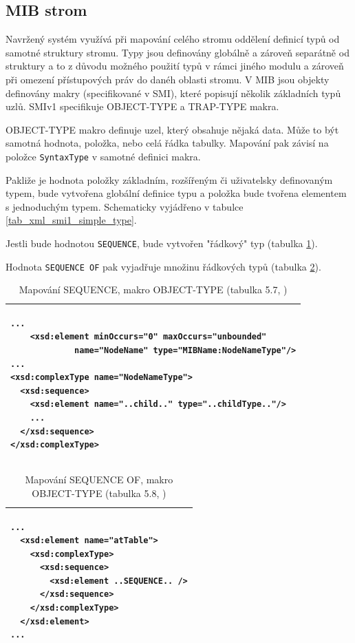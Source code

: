 \subsection{MIB strom}
Navržený systém využívá při mapování celého stromu oddělení definicí typů od samotné struktury stromu. Typy jsou definovány globálně a zároveň separátně od 
struktury a to z důvodu možného použití typů v rámci jiného modulu a zároveň při omezení přístupových práv do danéh oblasti stromu. V MIB jsou objekty
definovány makry (specifikované v SMI), které popisují několik základních typů uzlů. SMIv1 specifikuje OBJECT-TYPE a TRAP-TYPE makra.

OBJECT-TYPE makro definuje uzel, který obsahuje nějaká data. Může to být samotná hodnota, položka, nebo celá řádka tabulky. Mapování pak závisí na
položce \verb|SyntaxType| v samotné definici makra.

Pakliže je hodnota položky základním, rozšířeným či uživatelsky definovaným typem, bude vytvořena globální definice typu a položka bude tvořena elementem
s jednoduchým typem. Schematicky vyjádřeno v tabulce \ref{tab_xml_smi1_simple_type}.

Jestli bude hodnotou \verb|SEQUENCE|, bude vytvořen "řádkový" typ (tabulka \ref{tab_xml_smi1_sequence}).

Hodnota \verb|SEQUENCE OF| pak vyjadřuje množinu řádkových typů (tabulka \ref{tab_xml_smi1_sequenceof}).


\begin{table}
	\centering
	{\footnotesize
	  \begin{tabular}{|p{15cm}|}
      \hline
\begin{verbatim}...
    <xsd:element minOccurs="0" maxOccurs="unbounded"
             name="NodeName" type="MIBName:NodeNameType"/>
...
<xsd:complexType name="NodeNameType">
  <xsd:sequence>
    <xsd:element name="..child.." type="..childType.."/>
    ...
  </xsd:sequence>
</xsd:complexType>\end{verbatim}\\
      \hline
    \end{tabular}
  }
	\caption{Mapování SEQUENCE, makro OBJECT-TYPE (tabulka 5.7, \cite{macejko_dipl})}
	\label{tab_xml_smi1_sequence}
\end{table}

\begin{table}
	\centering
	{\footnotesize
	  \begin{tabular}{|p{15cm}|}
      \hline
\begin{verbatim}...
  <xsd:element name="atTable">
    <xsd:complexType>
      <xsd:sequence>
        <xsd:element ..SEQUENCE.. />
      </xsd:sequence>
    </xsd:complexType>
  </xsd:element>
...\end{verbatim}\\
      \hline
    \end{tabular}
  }
	\caption{Mapování SEQUENCE OF, makro OBJECT-TYPE (tabulka 5.8, \cite{macejko_dipl})}
	\label{tab_xml_smi1_sequenceof}
\end{table}

